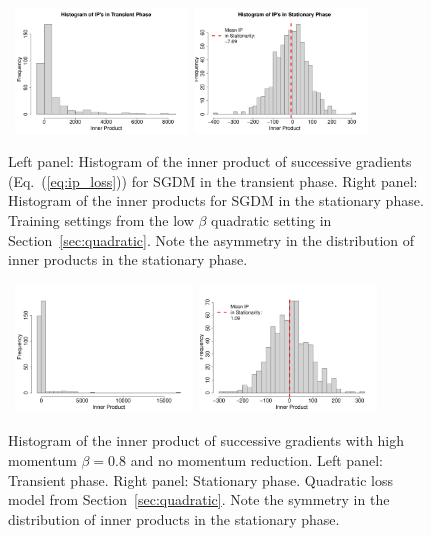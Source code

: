 \documentclass[conference]{IEEEtran}
\begin{document}
\begin{figure}[h]
\mbox{\hspace{-0.1in}
  \includegraphics[width=1.8in]{fig/HistIPTrans.pdf}\hspace{-0.12in}
  \includegraphics[width=1.8in]{fig/HistIPStat.pdf}
}
\vspace{-0.2in}
  \caption{Left panel:  Histogram of the inner product of successive gradients (Eq.~(\ref{eq:ip_loss})) for SGDM in the transient phase. Right panel: 
  Histogram of the inner products for SGDM in the stationary phase. 
  Training settings from the low $\beta$ quadratic setting in Section~\ref{sec:quadratic}.
  Note the asymmetry in the distribution of inner products in the stationary phase. 
  }
\label{fig:hist_ip}
\end{figure}

\begin{figure}[h]
\mbox{\hspace{-0.1in}
  \includegraphics[width=1.85in]{fig/HighMomHistIPTrans.pdf}\hspace{-0.12in}
  \includegraphics[width=1.85in]{fig/HighMomHistIPStat.pdf}
}
\vspace{-0.2in}
  \caption{ Histogram of the inner product of successive gradients with high momentum $\beta=0.8$ and no momentum reduction. 
  Left panel: Transient phase. 
  Right panel: Stationary phase.
 Quadratic loss model from Section~\ref{sec:quadratic}.
  Note the symmetry in the distribution of inner products in the stationary phase.
  }
\label{fig:hist_ip_highmom}
\end{figure}
\end{document}

